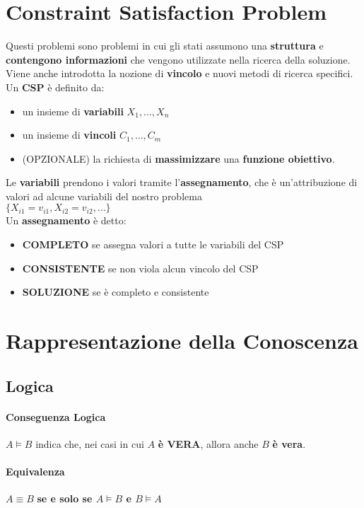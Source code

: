 \documentclass[14pt]{extarticle}
\begin{document}
\section{Constraint Satisfaction Problem}
Questi problemi sono problemi in cui gli stati assumono una \textbf{struttura} e \textbf{contengono informazioni} che vengono utilizzate nella ricerca della soluzione.\\
Viene anche introdotta la nozione di  \textbf{vincolo} e nuovi metodi di ricerca specifici.\\
Un \textbf{CSP} è definito da:
\begin{itemize}
    \item un insieme di \textbf{variabili} $X_1, \dots,X_n$
    \item un insieme di \textbf{vincoli} $C_1, \dots,C_m$
    \item (OPZIONALE) la richiesta di \textbf{massimizzare} una \textbf{funzione obiettivo}.
\end{itemize}
Le \textbf{variabili} prendono i valori tramite l'\textbf{assegnamento}, che è un'attribuzione di valori ad alcune variabili del nostro problema\\
 $\{X_{i1}=v_{i1}, X_{i2}=v_{i2}, \dots\}$\\
Un \textbf{assegnamento} è detto:
\begin{itemize}
    \item \textbf{COMPLETO} se assegna valori a tutte le variabili del CSP
    \item \textbf{CONSISTENTE} se non viola alcun vincolo del CSP
    \item \textbf{SOLUZIONE} se è completo e consistente
\end{itemize}

\section{Rappresentazione della Conoscenza}
\subsection{Logica}
\paragraph{Conseguenza Logica}
$A \models B$ indica che, nei casi in cui $A$ \textbf{è VERA}, allora anche $B$ \textbf{è vera}.
\paragraph{Equivalenza}
$A \equiv B$ \textbf{se e solo se $A \models B$ e $B \models A$}
\end{document}

